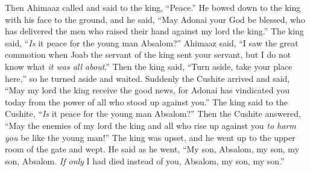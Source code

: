 \begin{biblechapter}
\verse Then Ahimaaz called and said to the king, “Peace.” He bowed down to the king with his face to the ground, and he said, “May Adonai your God be blessed, who has delivered the men who raised their hand against my lord the king.”
\verse The king said, “\textit{Is} it peace for the young man Absalom?” Ahimaaz said, “I saw the great commotion when Joab the servant of the king sent your servant, but I do not know what \textit{it was all about}.”
\verse Then the king said, “Turn aside, take your place here,” so he turned aside and waited.
\verse Suddenly the Cushite arrived and said, “May my lord the king receive the good news, for Adonai has vindicated you today from the power of all who stood up against you.”
\verse The king said to the Cushite, “\textit{Is} it peace for the young man Absalom?” Then the Cushite answered, “May the enemies of my lord the king and all who rise up against you \textit{to harm you} be like the young man!”
\verse  The king was upset, and he went up to the upper room of the gate and wept. He said as he went, “My son, Absalom, my son, my son, Absalom. \textit{If only} I had died instead of you, Absalom, my son, my son.”
\end{biblechapter}

